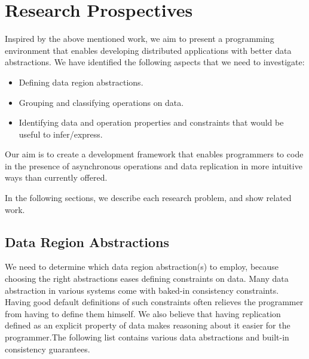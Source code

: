 \documentclass[]{usiinfprospectus}
\begin{document}
\section{Research Prospectives}

Inspired by the above mentioned work, we aim to present a programming environment that enables developing distributed applications with better data abstractions. We have identified the following aspects that we need to investigate: 

\begin{itemize}
	\item Defining data region abstractions.
	\item Grouping and classifying operations on data.
	\item Identifying data and operation properties and constraints that would be useful to infer/express.
\end{itemize}	
Our aim is to create a development framework that enables programmers to code in the presence of asynchronous operations and data replication in more intuitive ways than currently offered. 

In the following sections, we describe each research problem, and show related work.

\subsection{Data Region Abstractions}
We need to determine which data region abstraction(s) to employ, because choosing the right abstractions eases defining constraints on data. Many data abstraction in various systems come with baked-in consistency constraints. Having good default definitions of such constraints often relieves the programmer from having to define them himself. We also believe that having replication defined as an explicit property of data makes reasoning about it easier for the programmer.The following list contains various data abstractions and built-in consistency guarantees. 
\end{document}
